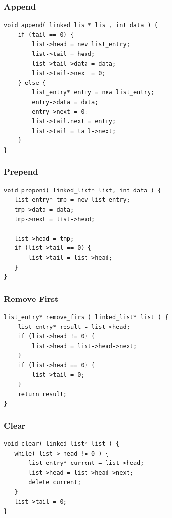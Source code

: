 \begin{frame}[fragile]
\frametitle{Append}

\begin{verbatim}
void append( linked_list* list, int data ) {
    if (tail == 0) {
        list->head = new list_entry;
        list->tail = head;
        list->tail->data = data;
        list->tail->next = 0;
    } else { 
        list_entry* entry = new list_entry;
        entry->data = data;
        entry->next = 0;
        list->tail.next = entry;
        list->tail = tail->next;
    }
}
\end{verbatim}

\end{frame}

\begin{frame}[fragile]
\frametitle{Prepend}

\begin{verbatim}
void prepend( linked_list* list, int data ) {
   list_entry* tmp = new list_entry;
   tmp->data = data;
   tmp->next = list->head;
   
   list->head = tmp;
   if (list->tail == 0) {
       list->tail = list->head;
   }
}
\end{verbatim}

\end{frame}

\begin{frame}[fragile]
\frametitle{Remove First}

\begin{verbatim}
list_entry* remove_first( linked_list* list ) {
    list_entry* result = list->head;
    if (list->head != 0) {
        list->head = list->head->next;
    }
    if (list->head == 0) {
        list->tail = 0;
    }
    return result;
}
\end{verbatim}

\end{frame}


\begin{frame}[fragile]
\frametitle{Clear}

\begin{verbatim}
void clear( linked_list* list ) {
   while( list-> head != 0 ) {
       list_entry* current = list->head;
       list->head = list->head->next;
       delete current;	
   }
   list->tail = 0;
}
\end{verbatim}

\end{frame}


